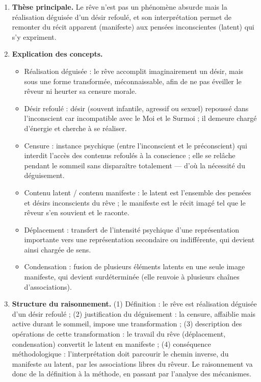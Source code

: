 \documentclass[11pt]{article}
\newcommand{\cle}[1]{{\popxbold\color{popdark}#1}}
\begin{document}
\begin{corrige}
\begin{enumerate}
\item \textbf{Thèse principale.} Le rêve n'est pas un phénomène absurde mais la réalisation déguisée d'un désir refoulé, et son interprétation permet de remonter du récit apparent (manifeste) aux pensées inconscientes (latent) qui s'y expriment.
\item \textbf{Explication des concepts.}
\begin{itemize}
\item \cle{Réalisation déguisée} : le rêve accomplit imaginairement un désir, mais sous une forme transformée, méconnaissable, afin de ne pas éveiller le rêveur ni heurter sa censure morale.
\item \cle{Désir refoulé} : désir (souvent infantile, agressif ou sexuel) repoussé dans l'inconscient car incompatible avec le Moi et le Surmoi ; il demeure chargé d'énergie et cherche à se réaliser.
\item \cle{Censure} : instance psychique (entre l'inconscient et le préconscient) qui interdit l'accès des contenus refoulés à la conscience ; elle se relâche pendant le sommeil sans disparaître totalement — d'où la nécessité du déguisement.
\item \cle{Contenu latent / contenu manifeste} : le latent est l'ensemble des pensées et désirs inconscients du rêve ; le manifeste est le récit imagé tel que le rêveur s'en souvient et le raconte.
\item \cle{Déplacement} : transfert de l'intensité psychique d'une représentation importante vers une représentation secondaire ou indifférente, qui devient ainsi chargée de sens.
\item \cle{Condensation} : fusion de plusieurs éléments latents en une seule image manifeste, qui devient surdéterminée (elle renvoie à plusieurs chaînes d'associations).
\end{itemize}
\item \textbf{Structure du raisonnement.} (1) Définition : le rêve est réalisation déguisée d'un désir refoulé ; (2) justification du déguisement : la censure, affaiblie mais active durant le sommeil, impose une transformation ; (3) description des opérations de cette transformation : le travail du rêve (déplacement, condensation) convertit le latent en manifeste ; (4) conséquence méthodologique : l'interprétation doit parcourir le chemin inverse, du manifeste au latent, par les associations libres du rêveur. Le raisonnement va donc de la définition à la méthode, en passant par l'analyse des mécanismes.

\end{enumerate}
\end{corrige}
\end{document}
